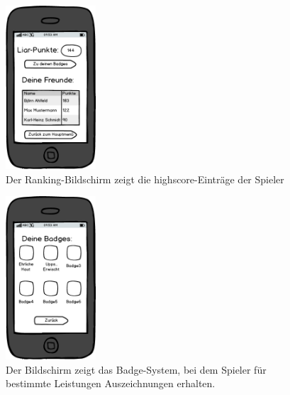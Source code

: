 \documentclass[10pt, a4paper, oneside, titlepage]{scrartcl} %
\begin{document}
	\newpage
	\begin{figure}[ht!]
		\begin{center}
			\includegraphics[width=0.3\textwidth]{mockup_07_ranking.png}
		\end{center}
		\caption[Mockup highscore-Bildschirm]{Der Ranking-Bildschirm zeigt die highscore-Einträge der Spieler}
		\label{fig:mockup_07}
	\end{figure}	
	\begin{figure}[h!]
		\begin{center}
			\includegraphics[width=0.3\textwidth]{mockup_08_badges.png}
		\end{center}
		\caption[Mockup Badge-Bildschirm]{Der Bildschirm zeigt das Badge-System, bei dem Spieler für bestimmte Leistungen Auszeichnungen erhalten.}
		\label{fig:mockup_08}
	\end{figure}	
\end{document}
